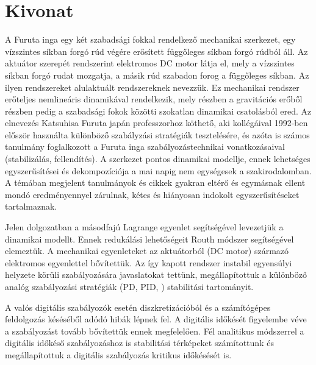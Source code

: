 	
	
\begin{otherlanguage}{hungarian}			%
\chapter*{Kivonat}							%
	
	A Furuta inga egy két szabadsági fokkal rendelkező mechanikai szerkezet, egy vízszintes síkban forgó rúd végére erősített függőleges síkban forgó rúdból áll. Az aktuátor szerepét rendszerint elektromos DC motor látja el, mely a vízszintes síkban forgó rudat mozgatja, a másik rúd szabadon forog a függőleges síkban. Az ilyen rendszereket alulaktuált rendszereknek nevezzük. Ez mechanikai rendszer erőteljes nemlineáris dinamikával rendelkezik, mely részben a gravitációs erőből részben pedig a szabadsági fokok közötti szokatlan dinamikai csatolásból ered. Az elnevezés Katsuhisa Furuta japán professzorhoz köthető, aki kollégáival 1992-ben először használta különböző szabályzási stratégiák tesztelésére, és azóta is számos tanulmány foglalkozott a Furuta inga szabályozástechnikai vonatkozásaival (stabilizálás, fellendítés). A szerkezet pontos dinamikai modellje, ennek lehetséges egyszerűsítései és dekompozíciója a mai napig nem egységesek a szakirodalomban. A témában megjelent tanulmányok és cikkek gyakran eltérő és egymásnak ellent mondó eredményennyel zárulnak, kétes és hiányosan indokolt egyszerűsítéseket tartalmaznak.
	
	Jelen dolgozatban a másodfajú Lagrange egyenlet segítségével levezetjük a dinamikai modellt. Ennek redukálási lehetőségeit Routh módszer segítségével elemeztük. A mechanikai egyenleteket az aktuátorból (DC motor) származó elektromos egyenlettel bővítettük. Az így kapott rendszer instabil egyensúlyi helyzete körüli szabályozására javaslatokat tettünk, megállapítottuk a különböző analóg szabályozási stratégiák (PD, PID, \PDD{}) stabilitási tartományit.
	
	A valós digitális szabályozók esetén diszkretizációból és a számítógépes feldolgozás késéséből adódó hibák lépnek fel. A digitális időkését figyelembe véve a szabályozást tovább bővítettük ennek megfelelően. Fél analitikus módszerrel a digitális időkéső szabályozáshoz is stabilitási térképeket számítottunk és megállapítottuk a digitális szabályozás kritikus időkésését is.
	
\end{otherlanguage} %
